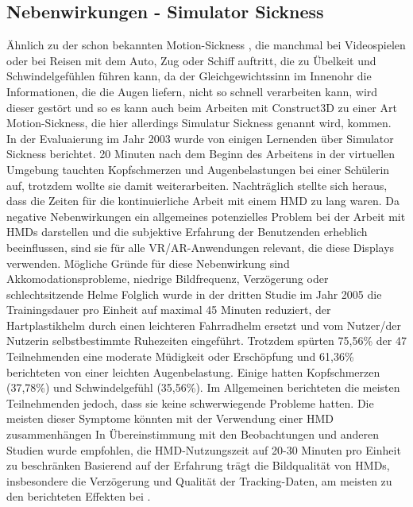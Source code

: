 \documentclass[deutsch]{llncs}
\begin{document}
\subsection{Nebenwirkungen - Simulator Sickness}
Ähnlich zu der schon bekannten Motion-Sickness \cite{motionsickness}, die manchmal bei Videospielen oder bei Reisen mit dem Auto, Zug oder Schiff auftritt, die zu Übelkeit und Schwindelgefühlen führen kann, da der Gleichgewichtssinn im Innenohr die Informationen, die die Augen liefern, nicht so schnell verarbeiten kann, wird dieser gestört und so es kann auch beim Arbeiten mit Construct3D zu einer Art Motion-Sickness, die hier allerdings
Simulatur Sickness genannt wird, kommen.
\noindent \\
In der Evaluaierung im Jahr 2003 wurde von einigen Lernenden über Simulator Sickness berichtet. 20 Minuten nach dem Beginn des Arbeitens in der virtuellen Umgebung tauchten Kopfschmerzen und Augenbelastungen bei einer Schülerin auf, trotzdem wollte sie damit weiterarbeiten. Nachträglich stellte sich heraus, dass die Zeiten für die kontinuierliche Arbeit mit einem HMD zu lang waren. Da negative Nebenwirkungen ein allgemeines potenzielles Problem bei der Arbeit mit HMDs darstellen und die subjektive Erfahrung der Benutzenden erheblich beeinflussen, sind sie für alle VR/AR-Anwendungen relevant, die diese Displays verwenden. Mögliche Gründe für diese Nebenwirkung sind Akkomodationsprobleme, niedrige Bildfrequenz, Verzögerung oder schlechtsitzende Helme 
Folglich wurde in der dritten Studie im Jahr 2005 die Trainingsdauer pro Einheit auf maximal 45 Minuten reduziert, der Hartplastikhelm durch einen leichteren Fahrradhelm ersetzt und vom Nutzer/der Nutzerin selbstbestimmte Ruhezeiten eingeführt. Trotzdem spürten 75,56\% der 47 Teilnehmenden eine moderate Müdigkeit oder Erschöpfung und 61,36\% berichteten von einer leichten Augenbelastung. Einige hatten Kopfschmerzen (37,78\%) und Schwindelgefühl (35,56\%). Im Allgemeinen berichteten die meisten Teilnehmenden jedoch, dass sie keine schwerwiegende Probleme hatten. Die meisten dieser Symptome könnten mit der Verwendung einer HMD zusammenhängen In Übereinstimmung mit den Beobachtungen und anderen Studien wurde empfohlen, die HMD-Nutzungszeit auf 20-30 Minuten pro Einheit zu beschränken  Basierend auf der Erfahrung trägt die Bildqualität von HMDs, insbesondere die Verzögerung und Qualität der Tracking-Daten, am meisten zu den berichteten Effekten bei \cite{Kaufmann_summaryof}.
\end{document}
